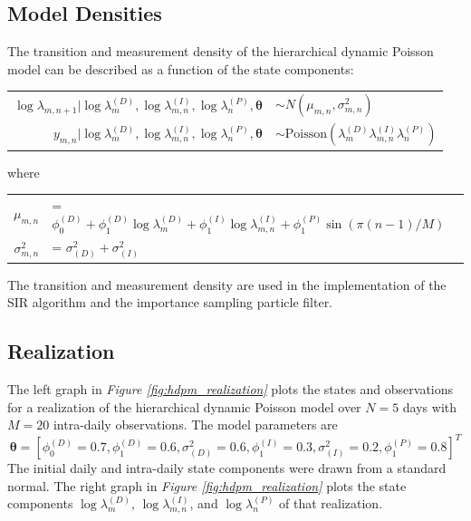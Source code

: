 \documentclass[11pt, oneside]{scrreprt}   	%
\begin{document}
\subsection{Model Densities}
The transition and measurement density of the hierarchical dynamic Poisson model can be described as a function of the state components:
\begin{center}
\begin{tabular}{ r l }
  $\log \lambda_{m,n+1} | \log \lambda_{m}^{(D)}, \log \lambda_{m,n}^{(I)}, \log \lambda_n^{(P)},\boldsymbol{\theta}$ & $\sim N(\mu_{m,n}, \sigma_{m,n}^2)$ \\
  $y_{m,n} | \log \lambda_{m}^{(D)}, \log \lambda_{m,n}^{(I)}, \log \lambda_n^{(P)},\boldsymbol{\theta}$ & $\sim \text{Poisson}(\lambda_{m}^{(D)} \lambda_{m,n}^{(I)} \lambda_n^{(P)})$ \\
\end{tabular}
\end{center}
where 
\begin{center}
\begin{tabular}{ r l }
  $\mu_{m,n}$ &= $\phi_0^{(D)} + \phi_1^{(D)} \log \lambda_{m}^{(D)} + \phi_1^{(I)} \log \lambda_{m,n}^{(I)} + \phi_1^{(P)} \sin(\pi (n-1)/M)$ \\
  $\sigma_{m,n}^2$ &= $\sigma_{(D)}^2 + \sigma_{(I)}^2$ \\
\end{tabular}
\end{center}
The transition and measurement density are used in the implementation of the SIR algorithm and the importance sampling particle filter.

\subsection{Realization}
The left graph in \textit{Figure \ref{fig:hdpm_realization}} plots the states and observations for a realization of the hierarchical dynamic Poisson model over $N=5$ days with $M=20$ intra-daily observations. The model parameters are 
$$
\boldsymbol{\theta} = [ \phi_0^{(D)} = 0.7,  \phi_1^{(D)} = 0.6, \sigma^2_{(D)} = 0.6, \phi_1^{(I)} = 0.3, \sigma^2_{(I)} = 0.2, \phi_1^{(P)} = 0.8]^T
$$
The initial daily and intra-daily state components were drawn from a standard normal. The right graph in \textit{Figure \ref{fig:hdpm_realization}} plots the state components $\log \lambda_{m}^{(D)}$, $\log \lambda_{m,n}^{(I)}$, and $\log \lambda_n^{(P)}$ of that realization.\\
\end{document}

